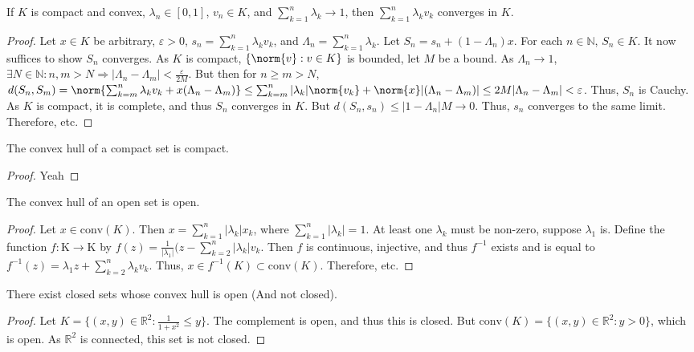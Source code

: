 \documentclass[crop=false,class=book]{standalone}
\begin{document}
\begin{theorem}
If $K$ is compact and convex, $\lambda_n\in[0,1]$, $v_n\in K$, and $\sum_{k=1}^{n}\lambda_k \rightarrow 1$, then $\sum_{k=1}^{n}\lambda_k v_k$ converges in $K$.
\end{theorem}
\begin{proof}
Let $x\in K$ be arbitrary, $\varepsilon>0$, $s_n = \sum_{k=1}^{n}\lambda_k v_k$, and $\Lambda_n = \sum_{k=1}^{n}\lambda_k$. Let $S_n = s_n + (1-\Lambda_n)x$. For each $n\in \mathbb{N}$, $S_n\in K$. It now suffices to show $S_n$ converges. As $K$ is compact, $\{\norm{v}:v\in K\}$ is bounded, let $M$ be a bound. As $\Lambda_n\rightarrow 1$, $\exists N\in \mathbb{N}:n,m>N\Rightarrow |\Lambda_n-\Lambda_m|<\frac{\varepsilon}{2M}$. But then for $n\geq m >N$, $d(S_n,S_m) = \norm{\sum_{k=m}^{n}\lambda_k v_k+x(\Lambda_n-\Lambda_m)} \leq \sum_{k=m}^{n}|\lambda_k| \norm{v_k}+\norm{x}|(\Lambda_n-\Lambda_m)|\leq 2M|\Lambda_{n}-\Lambda_{m}|<\varepsilon$. Thus, $S_n$ is Cauchy. As $K$ is compact, it is complete, and thus $S_n$ converges in $K$. But $d(S_n,s_n)\leq |1-\Lambda_n|M\rightarrow 0$. Thus, $s_n$ converges to the same limit. Therefore, etc.
\end{proof}
\begin{theorem}
The convex hull of a compact set is compact.
\end{theorem}
\begin{proof}
Yeah
\end{proof}
\begin{theorem}
The convex hull of an open set is open.
\end{theorem}
\begin{proof}
Let $x\in \textrm{conv}(K)$. Then $x=\sum_{k=1}^{n}|\lambda_k| x_k$, where $\sum_{k=1}^{n}|\lambda_k| = 1$. At least one $\lambda_k$ must be non-zero, suppose $\lambda_1$ is. Define the function $f:\textrm{K}\rightarrow \textrm{K}$ by $f(z) = \frac{1}{|\lambda_1|}(z-\sum_{k=2}^{n}|\lambda_k|v_k$. Then $f$ is continuous, injective, and thus $f^{-1}$ exists and is equal to $f^{-1}(z) = \lambda_1 z +\sum_{k=2}^{n}\lambda_k v_k$. Thus, $x\in f^{-1}(K)\subset\textrm{conv}(K)$. Therefore, etc. 
\end{proof}
\begin{theorem}
There exist closed sets whose convex hull is open (And not closed).
\end{theorem}
\begin{proof}
Let $K = \{(x,y)\in \mathbb{R}^2:\frac{1}{1+x^2}\leq y\}$. The complement is open, and thus this is closed. But $\textrm{conv}(K) = \{(x,y)\in \mathbb{R}^2:y>0\}$, which is open. As $\mathbb{R}^2$ is connected, this set is not closed.
\end{proof}
\end{document}
